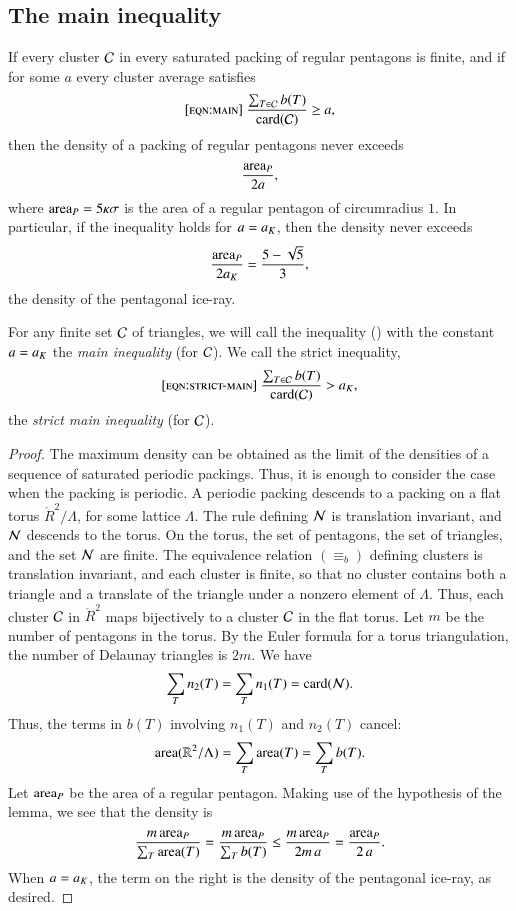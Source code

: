 \subsection{The main inequality}

\begin{lemma}  
If  every cluster $\mathcal C$ in every saturated packing of regular
  pentagons is finite, and if for some $a$ every cluster average
  satisfies
\begin{equation}\libel{eqn:main}
\frac{\sum_{T\in \C} b(T)}{\card(\C)} \ge a,
\end{equation}
then the density of a packing of regular pentagons never exceeds 
\[
\frac{{\operatorname{area}}_P} {2 a},
\]
where ${\operatorname{area}}_P = 5\kappa\sigma$ is the area of a regular pentagon of
circumradius $1$.  In particular, if the inequality holds for $a=a_K$,
then the density never exceeds
\[
\frac{{\operatorname{area}}_P}{2 a_K} = \frac{5 - \sqrt{5}}{3},
\] %
the density of the pentagonal ice-ray.
\end{lemma}

For any finite set $\mathcal C$ of triangles, we will call the inequality
() with the constant $a=a_K$ the {\it main inequality}
(for $\mathcal C$).  We call the strict inequality,
\begin{equation}\libel{eqn:strict-main}
\frac{\sum_{T\in \C} b(T)}{\card(\C)} > \aK,
\end{equation}
the {\it strict main inequality} (for $\mathcal C$).


\begin{proof} The maximum density can be obtained as the limit of the
  densities of a sequence of saturated periodic packings.  Thus, it is
  enough to consider the case when the packing is periodic.  A
  periodic packing descends to a packing on a flat torus
  $\ring{R}^2/\Lambda$, for some lattice $\Lambda$.  The rule defining
  $\mathcal N$ is translation invariant, and $\mathcal N$ descends to the torus.  On
  the torus, the set of pentagons, the set of triangles, and the set
  $\mathcal N$ are finite.  The equivalence relation $(\equiv_b)$ defining
  clusters is translation invariant, and each cluster is finite, so
  that no cluster contains both a triangle and a translate of the
  triangle under a nonzero element of $\Lambda$.  Thus, each cluster
  $\mathcal C$ in $\ring{R}^2$ maps bijectively to a cluster $\mathcal C$ in the flat
  torus.  Let $m$ be the number of pentagons in the torus.  By the
  Euler formula for a torus triangulation, the number of Delaunay
  triangles is $2m$.  We have
\[
\sum_{T} n_2(T) =  \sum_{T} n_1(T) = 
{\operatorname{card}}(\mathcal N).
\]
Thus, the terms in $b(T)$ involving $n_1(T)$ and $n_2(T)$ cancel:
\[
{\operatorname{area}}(\mathbb{R}^2/\Lambda) = \sum_T {\operatorname{area}}(T) = \sum_T b(T).
\]    
Let ${\operatorname{area}}_P$ be the area of a regular pentagon.  Making use of the
hypothesis of the lemma, we see that the density is
\[
\frac{m\, {\operatorname{area}}_P}{\sum_T {\operatorname{area}}(T)} 
=\frac{m\, {\operatorname{area}}_P}{\sum_T b(T)} \le\frac{m\, {\operatorname{area}}_P}{2 m\, a} 
= \frac{{\operatorname{area}}_P}{2\, a}.
\]
When $a=a_K$, the term on the right is the density of the pentagonal ice-ray,
 as desired.
\end{proof}

